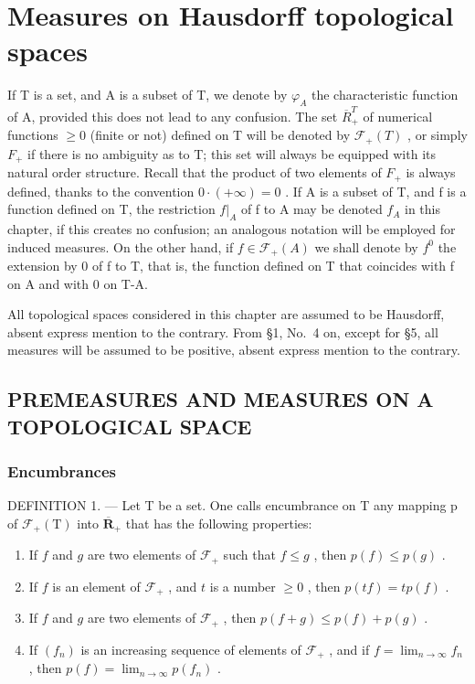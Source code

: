 \chapter{Measures on Hausdorff topological spaces}

If T is a set, and A is a subset of T, we denote by \(\varphi_{A}\) the characteristic function of A, provided this does not lead to any confusion. The set \(\overline{R}_{+}^{T}\) of numerical functions \(\geqslant0\) (finite or not) defined on T will be denoted by \(\mathcal{F}_{+}(T)\) , or simply \(F_{+}\) if there is no ambiguity as to T; this set will always be equipped with its natural order structure. Recall that the product of two elements of \(F_{+}\) is always defined, thanks to the convention \(0\cdot(+\infty)=0\) . If A is a subset of T, and f is a function defined on T, the restriction \(f|_{A}\) of f to A may be denoted \(f_{A}\) in this chapter, if this creates no confusion; an analogous notation will be employed for induced measures. On the other hand, if \(f\in\mathcal{F}_{+}(A)\) we shall denote by \(f^{0}\) the extension by 0 of f to T, that is, the function defined on T that coincides with f on A and with 0 on T-A.

All topological spaces considered in this chapter are assumed to be Hausdorff, absent express mention to the contrary. From §1, No.~4 on, except for §5, all measures will be assumed to be positive, absent express mention to the contrary.

\section{PREMEASURES AND MEASURES ON A TOPOLOGICAL SPACE}

\subsection{Encumbrances}

DEFINITION 1. --- Let T be a set. One calls encumbrance on T any mapping p of \(\mathcal{F}_{+}(\mathrm{T})\) into \(\overline{\mathbf{R}}_{+}\) that has the following properties:

\begin{enumerate}
\def\labelenumi{\alph{enumi})}
\item
  If \(f\) and \(g\) are two elements of \(\mathcal{F}_+\) such that \(f \leqslant g\) , then \(p(f) \leqslant p(g)\) .
\item
  If \(f\) is an element of \(\mathcal{F}_+\) , and \(t\) is a number \(\geqslant 0\) , then \(p(tf) = tp(f)\) .
\item
  If \(f\) and \(g\) are two elements of \(\mathcal{F}_+\) , then \(p(f + g) \leqslant p(f) + p(g)\) .
\item
  If \((f_n)\) is an increasing sequence of elements of \(\mathcal{F}_+\) , and if \(f = \lim_{n \to \infty} f_n\) , then \(p(f) = \lim_{n \to \infty} p(f_n)\) .
\end{enumerate}

